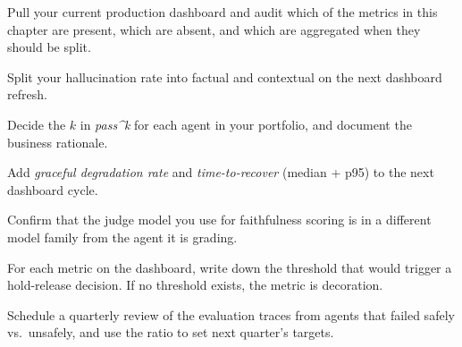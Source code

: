 \begin{TNchecklist}
\item Pull your current production dashboard and audit which of the metrics in this chapter are present, which are absent, and which are aggregated when they should be split.
\item Split your hallucination rate into factual and contextual on the next dashboard refresh.
\item Decide the $k$ in \textit{pass\textasciicircum k} for each agent in your portfolio, and document the business rationale.
\item Add \textit{graceful degradation rate} and \textit{time-to-recover} (median + p95) to the next dashboard cycle.
\item Confirm that the judge model you use for faithfulness scoring is in a different model family from the agent it is grading.
\item For each metric on the dashboard, write down the threshold that would trigger a hold-release decision. If no threshold exists, the metric is decoration.
\item Schedule a quarterly review of the evaluation traces from agents that failed safely vs.\ unsafely, and use the ratio to set next quarter's targets.
\end{TNchecklist}



